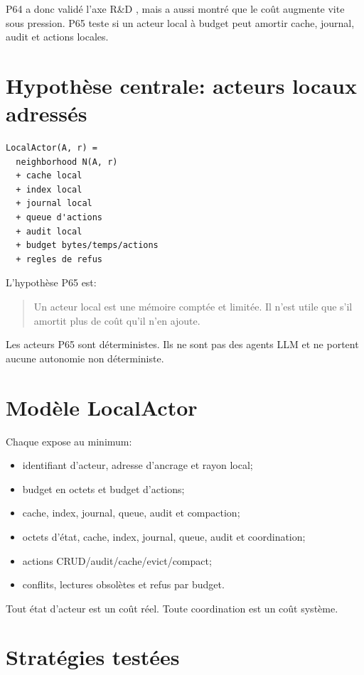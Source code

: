 \documentclass[a4paper,11pt]{article}
\newcommand{\Code}[1]{\texttt{\detokenize{#1}}}
\begin{document}
P64 a donc valid\'e l'axe R\&D \Code{address-local}, mais a aussi montr\'e que le
co\^ut augmente vite sous pression. P65 teste si un acteur local \`a budget peut
amortir cache, journal, audit et actions locales.

\section{Hypoth\`ese centrale: acteurs locaux adress\'es}

\begin{verbatim}
LocalActor(A, r) =
  neighborhood N(A, r)
  + cache local
  + index local
  + journal local
  + queue d'actions
  + audit local
  + budget bytes/temps/actions
  + regles de refus
\end{verbatim}

L'hypoth\`ese P65 est:

\begin{quote}
Un acteur local est une m\'emoire compt\'ee et limit\'ee. Il n'est utile que s'il
amortit plus de co\^ut qu'il n'en ajoute.
\end{quote}

Les acteurs P65 sont d\'eterministes. Ils ne sont pas des agents LLM et ne
portent aucune autonomie non d\'eterministe.

\section{Mod\`ele LocalActor}

Chaque \Code{LocalActor} expose au minimum:

\begin{itemize}
  \item identifiant d'acteur, adresse d'ancrage et rayon local;
  \item budget en octets et budget d'actions;
  \item cache, index, journal, queue, audit et compaction;
  \item octets d'\'etat, cache, index, journal, queue, audit et coordination;
  \item actions CRUD/audit/cache/evict/compact;
  \item conflits, lectures obsol\`etes et refus par budget.
\end{itemize}

Tout \'etat d'acteur est un co\^ut r\'eel. Toute coordination est un co\^ut
syst\`eme.

\section{Strat\'egies test\'ees}
\end{document}

